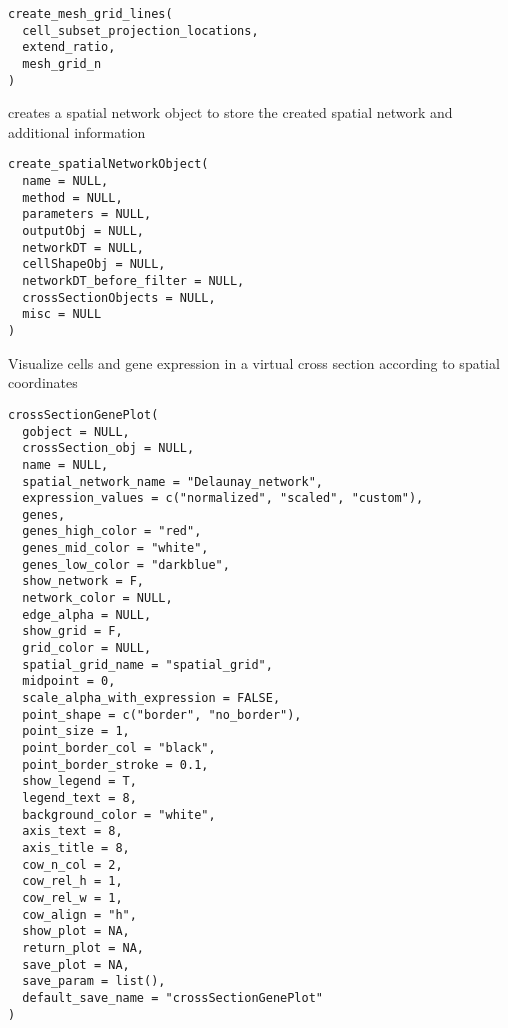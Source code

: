 \documentclass[a4paper]{book}
\begin{document}
%
\begin{Usage}
\begin{verbatim}
create_mesh_grid_lines(
  cell_subset_projection_locations,
  extend_ratio,
  mesh_grid_n
)
\end{verbatim}
\end{Usage}
%
\begin{Description}\relax
creates a spatial network object to store the created spatial network and additional information
\end{Description}
%
\begin{Usage}
\begin{verbatim}
create_spatialNetworkObject(
  name = NULL,
  method = NULL,
  parameters = NULL,
  outputObj = NULL,
  networkDT = NULL,
  cellShapeObj = NULL,
  networkDT_before_filter = NULL,
  crossSectionObjects = NULL,
  misc = NULL
)
\end{verbatim}
\end{Usage}
%
\begin{Description}\relax
Visualize cells and gene expression in a virtual cross section according to spatial coordinates
\end{Description}
%
\begin{Usage}
\begin{verbatim}
crossSectionGenePlot(
  gobject = NULL,
  crossSection_obj = NULL,
  name = NULL,
  spatial_network_name = "Delaunay_network",
  expression_values = c("normalized", "scaled", "custom"),
  genes,
  genes_high_color = "red",
  genes_mid_color = "white",
  genes_low_color = "darkblue",
  show_network = F,
  network_color = NULL,
  edge_alpha = NULL,
  show_grid = F,
  grid_color = NULL,
  spatial_grid_name = "spatial_grid",
  midpoint = 0,
  scale_alpha_with_expression = FALSE,
  point_shape = c("border", "no_border"),
  point_size = 1,
  point_border_col = "black",
  point_border_stroke = 0.1,
  show_legend = T,
  legend_text = 8,
  background_color = "white",
  axis_text = 8,
  axis_title = 8,
  cow_n_col = 2,
  cow_rel_h = 1,
  cow_rel_w = 1,
  cow_align = "h",
  show_plot = NA,
  return_plot = NA,
  save_plot = NA,
  save_param = list(),
  default_save_name = "crossSectionGenePlot"
)
\end{verbatim}
\end{Usage}
%
\end{document}
